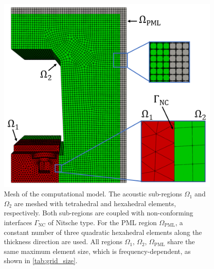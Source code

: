 {\begin{figure}
	\centering
	\includegraphics{fig/chap4/mesh/Mesh_with_labels_small.png}
	\caption{Mesh of the computational model. The acoustic sub-regions $\Omega_1$ and $\Omega_2$ are meshed with tetrahedral and hexahedral elements, respectively. Both sub-regions are coupled with non-conforming interfaces $\Gamma_\text{NC}$ of Nitsche type. For the PML region $\Omega_{\text{PML}}$, a constant number of three quadratic hexahedral elements along the thickness direction are used. All regions $\Omega_1$, $\Omega_2$, $\Omega_{\text{PML}}$ share the same maximum element size, which is frequency-dependent, as shown in \cref{tab:grid_size}.}
	\label{fig:mesh}
\end{figure}

}
